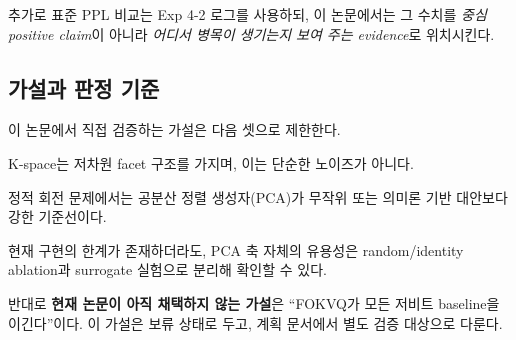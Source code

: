 추가로 표준 PPL 비교는 Exp 4-2 로그를 사용하되, 이 논문에서는 그 수치를 \emph{중심 positive claim}이 아니라 \emph{어디서 병목이 생기는지 보여 주는 evidence}로 위치시킨다.

\subsection{가설과 판정 기준}

이 논문에서 직접 검증하는 가설은 다음 셋으로 제한한다.

\begin{description}[leftmargin=1.6em,style=nextline]
\item[가설 H1] K-space는 저차원 facet 구조를 가지며, 이는 단순한 노이즈가 아니다.
\item[가설 H2] 정적 회전 문제에서는 공분산 정렬 생성자(PCA)가 무작위 또는 의미론 기반 대안보다 강한 기준선이다.
\item[가설 H3] 현재 구현의 한계가 존재하더라도, PCA 축 자체의 유용성은 random/identity ablation과 surrogate 실험으로 분리해 확인할 수 있다.
\end{description}

반대로 \textbf{현재 논문이 아직 채택하지 않는 가설}은 ``FOKVQ가 모든 저비트 baseline을 이긴다''이다. 이 가설은 보류 상태로 두고, 계획 문서에서 별도 검증 대상으로 다룬다.
